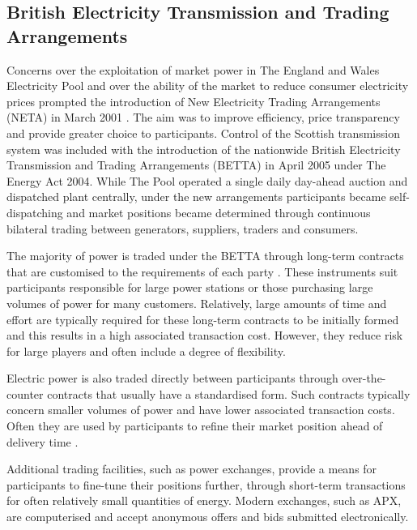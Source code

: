 \subsection{British Electricity Transmission and Trading Arrangements}
\label{sec:betta}
Concerns over the exploitation of market power in The England and Wales
Electricity Pool and over the ability of the market to reduce consumer
electricity prices prompted the introduction of New Electricity Trading
Arrangements (NETA) in March 2001 \cite{martoccia:2005}.  The aim was to improve
efficiency, price transparency and provide greater choice to participants.
Control of the Scottish transmission system was included with the introduction
of the nationwide British Electricity Transmission and Trading Arrangements
(BETTA) in April 2005 under The Energy Act 2004.  While The Pool operated a
single daily day-ahead auction and dispatched plant centrally, under the new
arrangements participants became self-dispatching and market positions became
determined through continuous bilateral trading between generators, suppliers,
traders and consumers.

The majority of power is traded under the BETTA through long-term contracts that
are customised to the requirements of each party \cite{kirschen:book}. These
instruments suit participants responsible for large power stations or those
purchasing large volumes of power for many customers.  Relatively, large amounts
of time and effort are typically required for these long-term contracts to be
initially formed and this results in a high associated transaction cost.
However, they reduce risk for large players and often include a degree of
flexibility.

Electric power is also traded directly between participants through
over-the-counter contracts that usually have a standardised form.  Such
contracts typically concern smaller volumes of power and have lower
associated transaction costs.  Often they are used by participants to refine
their market position ahead of delivery time \cite{kirschen:book}.

Additional trading facilities, such as power exchanges, provide a means for
participants to fine-tune their positions further, through short-term
transactions for often relatively small quantities of energy.  Modern exchanges,
such as APX, are computerised and accept anonymous offers and bids submitted
electronically.

